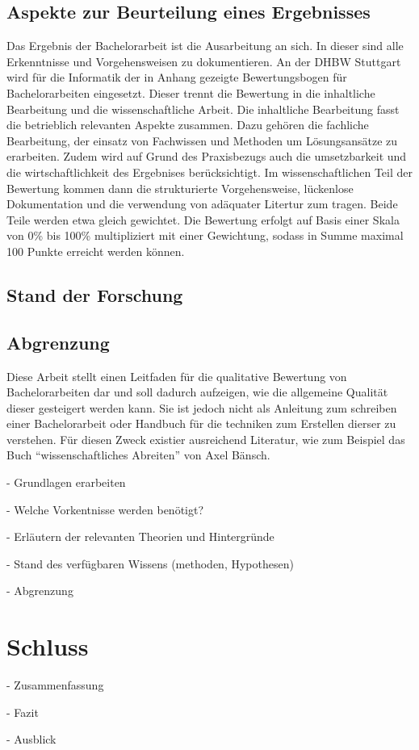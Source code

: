 \subsection{Aspekte zur Beurteilung eines Ergebnisses}
Das Ergebnis der Bachelorarbeit ist die Ausarbeitung an sich. In dieser sind alle Erkenntnisse und Vorgehensweisen zu dokumentieren. An der \ac{DHBW} Stuttgart wird für die Informatik der in Anhang  gezeigte Bewertungsbogen für Bachelorarbeiten eingesetzt. Dieser trennt die Bewertung in die inhaltliche Bearbeitung und die wissenschaftliche Arbeit. Die inhaltliche Bearbeitung fasst die betrieblich relevanten Aspekte zusammen. Dazu gehören die fachliche Bearbeitung, der einsatz von Fachwissen und Methoden um Lösungsansätze zu erarbeiten. Zudem wird auf Grund des Praxisbezugs auch die umsetzbarkeit und die wirtschaftlichkeit des Ergebnises berücksichtigt. 
Im wissenschaftlichen Teil der Bewertung kommen dann die strukturierte Vorgehensweise, lückenlose Dokumentation und die verwendung von adäquater Litertur zum tragen. 
Beide Teile werden etwa gleich gewichtet. Die Bewertung erfolgt auf Basis einer Skala von 0\% bis 100\% multipliziert mit einer Gewichtung, sodass in Summe maximal 100 Punkte erreicht werden können. 
\subsection{Stand der Forschung}


\subsection{Abgrenzung}
Diese Arbeit stellt einen Leitfaden für die qualitative Bewertung von Bachelorarbeiten dar und soll dadurch aufzeigen, wie die allgemeine Qualität dieser gesteigert werden kann. Sie ist jedoch nicht als Anleitung zum schreiben einer Bachelorarbeit oder Handbuch für die techniken zum Erstellen dierser zu verstehen. Für diesen Zweck existier ausreichend Literatur, wie zum Beispiel das Buch \enquote{wissenschaftliches Abreiten} von Axel Bänsch.\cite{Baensch:2013}

- Grundlagen erarbeiten

- Welche Vorkentnisse werden benötigt?

- Erläutern der relevanten Theorien und Hintergründe

- Stand des verfügbaren Wissens (methoden, Hypothesen)

- Abgrenzung


\section{Schluss}

- Zusammenfassung

- Fazit

- Ausblick
